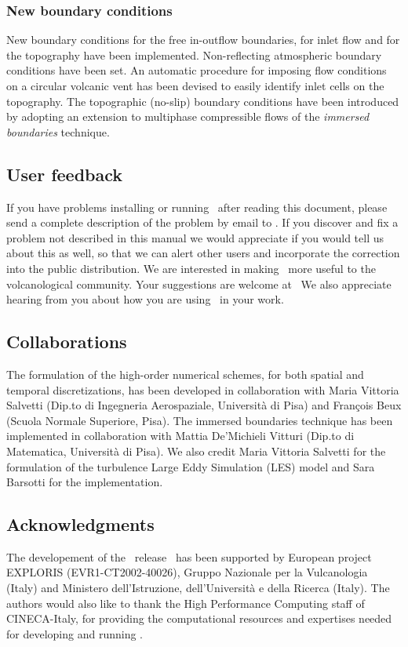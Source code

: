 \subsubsection*{New boundary conditions}
New boundary conditions for the free in-outflow boundaries, for inlet
flow and for the topography have been implemented. 
Non-reflecting atmospheric boundary conditions have been set.
An automatic procedure for imposing flow conditions on a circular 
volcanic vent has been devised to easily identify inlet cells on the
topography.
The topographic (no-slip) boundary
conditions have been introduced by adopting an extension to multiphase
compressible flows of the {\em immersed boundaries} technique.

\subsection{User feedback}

If you have problems installing or running \PDAC\ after
reading this document, please send a
complete description of the problem by email to \PDACADDRESS.
If you discover and fix a problem not described in this manual we would
appreciate if you would tell us about this as well, so that we can alert
other users and incorporate the correction into the public distribution.
\prettypar
We are interested in making \PDAC\ more useful to the volcanological
community.  Your suggestions are welcome at \PDACADDRESS\ 
We also appreciate hearing from you about how you are using \PDAC\ 
in your work.


\subsection{Collaborations}
The formulation of the high-order numerical schemes, for both spatial
and temporal discretizations, has been developed in collaboration with
Maria Vittoria Salvetti (Dip.to di Ingegneria Aerospaziale, Universit\`a 
di Pisa) and Fran\c{c}ois Beux (Scuola Normale Superiore, Pisa). The 
immersed boundaries technique has been implemented in collaboration with
Mattia De'Michieli Vitturi (Dip.to di Matematica, Universit\`a di Pisa). 
We also credit Maria Vittoria Salvetti for the formulation of the turbulence 
Large Eddy Simulation (LES) model and Sara Barsotti for the implementation.

\subsection{Acknowledgments}

The developement of the \PDAC\ release \PDACVERSION\ has been supported 
by European project EXPLORIS (EVR1-CT2002-40026), Gruppo Nazionale per
la Vulcanologia (Italy) and Ministero dell'Istruzione, dell'Universit\`a 
e della Ricerca (Italy).
\prettypar
The authors would also like to thank the High Performance Computing
staff of CINECA-Italy, for providing the computational resources and expertises
needed for developing and running \PDAC.
\prettypar
